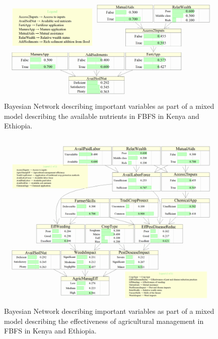\documentclass[]{elsarticle} %
\begin{document}
\begin{figure}[!h]

{\centering \includegraphics[width=1\linewidth,]{figures/Modelling_FBFS_Available_soil_Nutrients_BNs_plot} 

}

\caption{Bayesian Network describing important variables as part of a mixed model describing the available nutrients in FBFS in Kenya and Ethiopia.}\label{fig:fig4}
\end{figure}

\begin{figure}[!h]

{\centering \includegraphics[width=1\linewidth,]{figures/Modelling_FBFS_Agricultural_management_efficiency_BNs_plot} 

}

\caption{Bayesian Network describing important variables as part of a mixed model describing the effectiveness of agricultural management in FBFS in Kenya and Ethiopia.}\label{fig:fig5}
\end{figure}
\end{document}
